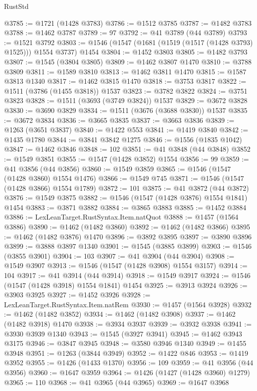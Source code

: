 \begin{lexlean}{RustStd}
\begin{coremodule}
@3785 := @1721 (@1428 @3783)
@3786 := @1512 @3785
@3787 := @1482 @3783
@3788 := @1462 @3787
@3789 := 97
@3792 := @41 @3789 (@44 @3789)
@3793 := @1521 @3792
@3803 := @1546 (@1547 (@1681 (@1519 (@1517 (@1428 @3793) @1525))) @1554 @3737) @1454
@3804 := @1452 @3803
@3805 := @1482 @3793
@3807 := @1545 (@3804 @3805)
@3809 := @1462 @3807 @1470
@3810 := @3788 @3809
@3811 := @1589 @3810
@3813 := @1462 @3811 @1470
@3815 := @1587 @3813 @1340
@3817 := @1462 @3815 @1470
@3818 := @3753 @3817
@3822 := @1511 (@3786 (@1455 @3818)) @1537
@3823 := @3782 @3822
@3824 := @3751 @3823
@3828 := @1511 (@3693 (@3749 @3824)) @1537
@3829 := @3672 @3828
@3830 := @3690 @3829
@3834 := @1511 (@3676 (@3688 @3830)) @1537
@3835 := @3672 @3834
@3836 := @3665 @3835
@3837 := @3663 @3836
@3839 := @1263 (@3651 @3837)
@3840 := @1422 @553
@3841 := @1419 @3840
@3842 := @1435 @1780
@3844 := @3841 @3842 @1275
@3846 := @1556 (@1835 @1042)
@3847 := @1462 @3846
@3848 := 102
@3851 := @41 @3848 (@44 @3848)
@3852 := @1549 @3851
@3855 := @1547 (@1428 @3852) @1554
@3856 := 99
@3859 := @41 @3856 (@44 @3856)
@3860 := @1549 @3859
@3865 := @1546 (@1547 (@1428 @3860) @1554 @1476)
@3866 := @1549 @745
@3871 := @1546 (@1547 (@1428 @3866) @1554 @1789)
@3872 := 101
@3875 := @41 @3872 (@44 @3872)
@3876 := @1549 @3875
@3882 := @1546 (@1547 (@1428 @3876) @1554 @1841) @1454
@3883 := @3871 @3882
@3884 := @3865 @3883
@3885 := @1452 @3884
@3886 := LexLeanTarget.RustSyntax.Item.natQuot
@3888 := @1457 (@1564 @3886)
@3890 := @1462 (@1482 @3860)
@3892 := @1462 (@1482 @3866)
@3895 := @1462 (@1482 @3876) @1470
@3896 := @3892 @3895
@3897 := @3890 @3896
@3899 := @3888 @3897 @1340
@3901 := @1545 (@3885 @3899)
@3903 := @1546 (@3855 @3901)
@3904 := 103
@3907 := @41 @3904 (@44 @3904)
@3908 := @1549 @3907
@3913 := @1546 (@1547 (@1428 @3908) @1554 @3157)
@3914 := 104
@3917 := @41 @3914 (@44 @3914)
@3918 := @1549 @3917
@3924 := @1546 (@1547 (@1428 @3918) @1554 @1841) @1454
@3925 := @3913 @3924
@3926 := @3903 @3925
@3927 := @1452 @3926
@3928 := LexLeanTarget.RustSyntax.Item.natRem
@3930 := @1457 (@1564 @3928)
@3932 := @1462 (@1482 @3852)
@3934 := @1462 (@1482 @3908)
@3937 := @1462 (@1482 @3918) @1470
@3938 := @3934 @3937
@3939 := @3932 @3938
@3941 := @3930 @3939 @1340
@3943 := @1545 (@3927 @3941)
@3945 := @1462 @3943 @3175
@3946 := @3847 @3945
@3948 := @3580 @3946 @1340
@3949 := @1455 @3948
@3951 := @1263 (@3844 @3949)
@3952 := @1422 @846
@3953 := @1419 @3952
@3955 := @1426 (@1433 @1370)
@3956 := 109
@3959 := @41 @3956 (@44 @3956)
@3960 := @1647 @3959
@3964 := @1426 (@1427 (@1428 @3960) @1279)
@3965 := 110
@3968 := @41 @3965 (@44 @3965)
@3969 := @1647 @3968

\end{coremodule}
\end{lexlean}
